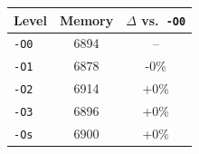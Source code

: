 \begin{tabular*}{\columnwidth}{@{\extracolsep\fill}lcc@{\extracolsep\fill}}
\toprule
\textbf{Level} & \textbf{Memory} & \textbf{$\Delta$ vs.\ \texttt{-O0}} \\
\midrule
\texttt{-O0} & 6894 & -- \\
\texttt{-O1} & 6878 & -0\% \\
\texttt{-O2} & 6914 & +0\% \\
\texttt{-O3} & 6896 & +0\% \\
\texttt{-Os} & 6900 & +0\% \\
\bottomrule
\end{tabular*}
